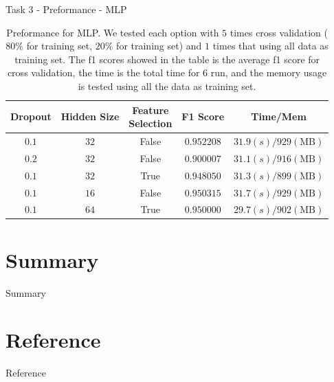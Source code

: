 \documentclass{beamer}
\begin{document}
\begin{frame}{Task 3 - Preformance - MLP}

  \begin{table}[H]
    \centering
    \begin{tabular}{|c|c|c|c|c|}
      \hline
      Dropout & Hidden Size & \makecell{Feature                                         \\ Selection} & F1 Score & Time/Mem \\
      \hline
      $0.1$   & $32$        & False             & $0.952208$ & $31.9(s)/929(\text{MB})$ \\
      \hline
      $0.2$   & $32$        & False             & $0.900007$ & $31.1(s)/916(\text{MB})$ \\
      \hline
      $0.1$   & $32$        & True              & $0.948050$ & $31.3(s)/899(\text{MB})$ \\
      \hline
      $0.1$   & $16$        & False             & $0.950315$ & $31.7(s)/929(\text{MB})$ \\
      \hline
      $0.1$   & $64$        & True              & $0.950000$ & $29.7(s)/902(\text{MB})$ \\
      \hline
    \end{tabular}
    \caption{Preformance for MLP. We tested each option with $5$ times cross validation ($80\%$ for training set, $20\%$ for training set) and $1$ times that using all data as training set. The f1 scores showed in the table is the average f1 score for cross validation, the time is the total time for $6$ run, and the memory usage is tested using all the data as training set.}
  \end{table}

\end{frame}


\section{Summary}

\begin{frame}{Summary}

\end{frame}

\section*{Reference}
\begin{frame}[allowframebreaks]{Reference}
  \printbibliography
\end{frame}

\appendix
\end{document}

